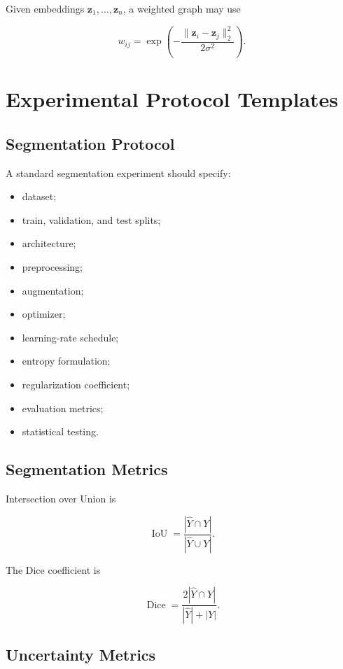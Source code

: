 \documentclass[11pt,oneside]{book}
\theoremstyle{remark}
\begin{document}
	Given embeddings \(\bm{z}_1,\ldots,\bm{z}_n\), a weighted graph may use
	
	\[
	w_{ij}
	=
	\exp
	\left(
	-\frac{
		\lVert\bm{z}_i-\bm{z}_j\rVert_2^2
	}{
		2\sigma^2
	}
	\right).
	\]
	
	\chapter{Experimental Protocol Templates}
	\label{app:experimental-protocols}
	
	\section{Segmentation Protocol}
	
	A standard segmentation experiment should specify:
	
	\begin{itemize}
		\item dataset;
		\item train, validation, and test splits;
		\item architecture;
		\item preprocessing;
		\item augmentation;
		\item optimizer;
		\item learning-rate schedule;
		\item entropy formulation;
		\item regularization coefficient;
		\item evaluation metrics;
		\item statistical testing.
	\end{itemize}
	
	\section{Segmentation Metrics}
	
	Intersection over Union is
	
	\[
	\operatorname{IoU}
	=
	\frac{
		|\widehat{Y}\cap Y|
	}{
		|\widehat{Y}\cup Y|
	}.
	\]
	
	The Dice coefficient is
	
	\[
	\operatorname{Dice}
	=
	\frac{
		2|\widehat{Y}\cap Y|
	}{
		|\widehat{Y}|+|Y|
	}.
	\]
	
	\section{Uncertainty Metrics}
	
\end{document}
